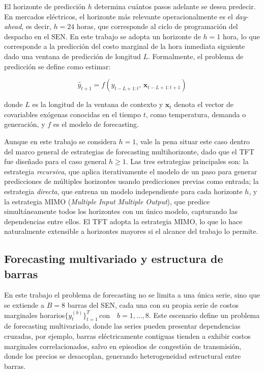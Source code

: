 El horizonte de predicción $h$ determina cuántos pasos adelante se desea predecir. En mercados eléctricos, el horizonte más relevante operacionalmente es el \textit{day-ahead}, es decir, $h=24$ horas, que corresponde al ciclo de programación del despacho en el SEN. En este trabajo se adopta un horizonte de $h=1$ hora, lo que corresponde a la predicción del costo marginal de la hora inmediata siguiente dado una ventana de predicción de longitud $L$. Formalmente, el problema de predicción se define como estimar:

\begin{equation}
    \hat{y}_{t+1} = f\left(y_{t-L+1:t},\, \mathbf{x}_{t-L+1:t+1}\right)
\end{equation}

donde $L$ es la longitud de la ventana de contexto y $\mathbf{x}_t$ denota el vector de covariables exógenas conocidas en el tiempo $t$, como temperatura, demanda o generación, y $f$ es el modelo de forecasting.

Aunque en este trabajo se considera $h=1$, vale la pena situar este caso dentro del marco general de estrategias de forecasting multihorizonte, dado que el TFT fue diseñado para el caso general $h \geq 1$. Las tres estrategias principales son: la estrategia \textit{recursiva}, que aplica iterativamente el modelo de un paso para generar predicciones de múltiples horizontes usando predicciones previas como entrada; la estrategia \textit{directa}, que entrena un modelo independiente para cada horizonte $h$, y la estrategia MIMO (\textit{Multiple Input Multiple Output}), que predice simultáneamente todos los horizontes con un único modelo, capturando las dependencias entre ellos. El TFT adopta la estrategia MIMO, lo que lo hace naturalmente extensible a horizontes mayores si el alcance del trabajo lo permite.

\subsection{Forecasting multivariado y estructura de barras}

En este trabajo el problema de forecasting no se limita a una única serie, sino que se extiende a $B = 8$ barras del SEN, cada una con su propia serie de costos marginales horarios$\{y_t^{(b)}\}_{t=1}^{T} \, \text{con} \quad b=1, ...,8$. Este escenario define un problema de forecasting multivariado, donde las series pueden presentar dependencias cruzadas, por ejemplo, barras eléctricamente contiguas tienden a exhibir costos marginales correlacionados, salvo en episodios de congestión de transmisión, donde los precios se desacoplan, generando heterogeneidad estructural entre barras. 

